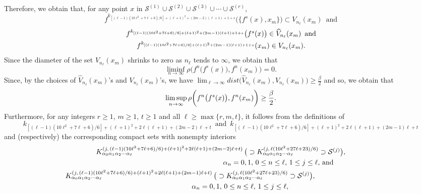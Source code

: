 \documentclass[12pt]{article}
\newcommand{\al}{\alpha}
\begin{document}
Therefore, we obtain that, for any point $x$ in $\mathcal S^{(1)} \cup \mathcal S^{(2)} \cup \mathcal S^{(3)} \cup \cdots \cup \mathcal S^{(r)}$, 
$$
f^{k_{[(\ell-1)(10\ell^2+7\ell+6)/6]+(\ell+1)^2+(2m-2)(\ell+1)+1+s}}\big(\{ f^s(x), x_m \}\big) \subset V_{n_\ell}(x_m) \,\,\, \text{and}
$$
\begin{multline*}
$$
f^{k_{[(\ell-1)(10\ell^2+7\ell+6)/6]+(\ell+1)^2+(2m-1)(\ell+1)+1+s}}\big(f^s(x)\big) \in \widehat V_{n_\ell}(x_m) \,\,\, \text{and} \\ f^{k_{[(\ell-1)(10\ell^2+7\ell+6)/6]+(\ell+1)^2+(2m-1)(\ell+1)+1+s}}(x_m) \in V_{n_\ell}(x_m).
$$
\end{multline*}
\indent Since the diameter of the set $V_{n_\ell}(x_m)$ shrinks to zero as $n_\ell$ tends to $\infty$, we obtain that 
$$
\liminf_{n \to \infty} \rho\bigg(f^n\big(f^s(x)\big), f^n(x_m)\bigg) = 0.
$$
\indent Since, by the choices of $\widehat V_{n_\ell}(x_m)$'s and $V_{n_\ell}(x_m)$'s, we have $\lim_{\ell \to \infty} dist\big(\widehat V_{n_\ell}(x_m), V_{n_\ell}(x_m)\big) \ge \frac \beta2$ and so, we obtain that 
$$
\limsup_{n \to \infty} \rho\bigg(f^n\big(f^s(x)\big), f^n(x_m)\bigg) \ge \frac \beta2.\vspace{.1in}
$$
\indent Furthermore, for any integers $r \ge 1$, $m \ge 1$, $t \ge 1$ and all $\ell \ge \max \{ r, m, t \}$, it follows from the definitions of    
$$
k_{[(\ell-1)(10\ell^2+7\ell+6)/6]+(\ell+1)^2+2\ell(\ell+1)+(2m-2)\ell+t} \,\,\, \text{and} \,\,\, k_{[(\ell-1)(10\ell^2+7\ell+6)/6]+(\ell+1)^2+2\ell(\ell+1)+(2m-1)\ell+t}
$$ 
and (respectively) the corresponding compact sets with nonempty interiors 
\begin{multline*}
$$
K_{\al_0\al_1\al_2\cdots\al_\ell}^{(j, \, (\ell-1)(10\ell^2+7\ell+6)/6)+(\ell+1)^2+2\ell(\ell+1)+(2m-2)\ell+t)} \, \big(\supset K_{\al_0\al_1\al_2\cdots\al_\ell}^{(j, \, \ell(10\ell^2+27\ell+23)/6)} \supset \mathcal S^{(j)}\big), \\
\qquad\qquad\qquad\qquad\qquad\qquad\qquad\quad\quad\,\, \al_n = 0, 1, \, 0 \le n \le \ell, \, 1 \le j \le \ell, \, \text{and} \\ 
K_{\al_0\al_1\al_2\cdots\al_\ell}^{(j, \, (\ell-1)(10\ell^2+7\ell+6)/6)+(\ell+1)^2+2\ell(\ell+1)+(2m-1)\ell+t)} \, \big(\supset K_{\al_0\al_1\al_2\cdots\al_\ell}^{(j, \, \ell(10\ell^2+27\ell+23)/6)} \supset \mathcal S^{(j)}\big), \qquad\qquad\qquad\qquad\,\,\,\, \\
\qquad\qquad\qquad\qquad\qquad\qquad \al_n = 0, 1, \, 0 \le n \le \ell, \, 1 \le j \le \ell, \qquad\qquad\qquad\,\,\,
$$
\end{multline*}
\end{document}

